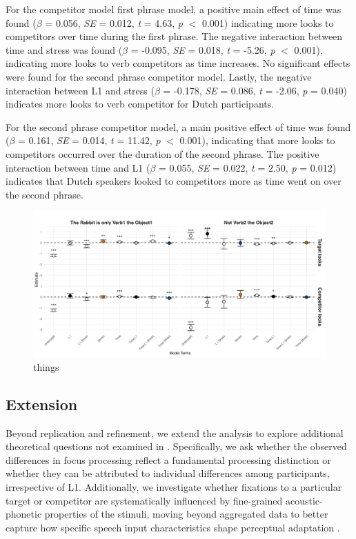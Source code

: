 For the competitor model first phrase model, a positive main effect of time was found ($\beta$ = 0.056, \textit{SE} = 0.012, \textit{t} = 4.63, \textit{p} $<$ 0.001) indicating more looks to competitors over time during the first phrase. The negative interaction between time and stress was found ($\beta$ = -0.095, \textit{SE} = 0.018, \textit{t} = -5.26, \textit{p} $<$ 0.001), indicating more looks to verb competitors as time increases. No significant effects were found for the second phrase competitor model. Lastly, the negative interaction between L1 and stress ($\beta$ = -0.178, \textit{SE} = 0.086, \textit{t} = -2.06, \textit{p} = 0.040) indicates more looks to verb competitor for Dutch participants.

For the second phrase competitor model, a main positive effect of time was found ($\beta$ = 0.161, \textit{SE} = 0.014, \textit{t} = 11.42, \textit{p} $<$ 0.001), indicating that more looks to competitors occurred over the duration of the second phrase. The positive interaction between time and L1 ($\beta$ = 0.055, \textit{SE} = 0.022, \textit{t} = 2.50, \textit{p} = 0.012) indicates that Dutch speakers looked to competitors more as time went on over the second phrase. 

\begin{figure}[H]  %
    \centering
    \includegraphics[width=\textwidth,height=\textheight,keepaspectratio]{viz/gam_mod_out.png}
    \caption{things}
    \label{fig:gam_mod_out}
\end{figure}

\subsection{Extension}

Beyond replication and refinement, we extend the analysis to explore additional theoretical questions not examined in \cite{Ge2021}. Specifically, we ask whether the observed differences in focus processing reflect a fundamental processing distinction or whether they can be attributed to individual differences among participants, irrespective of L1. Additionally, we investigate whether fixations to a particular target or competitor are systematically influenced by fine-grained acoustic-phonetic properties of the stimuli, moving beyond aggregated data to better capture how specific speech input characteristics shape perceptual adaptation \citep{xie2023adaptive}.

